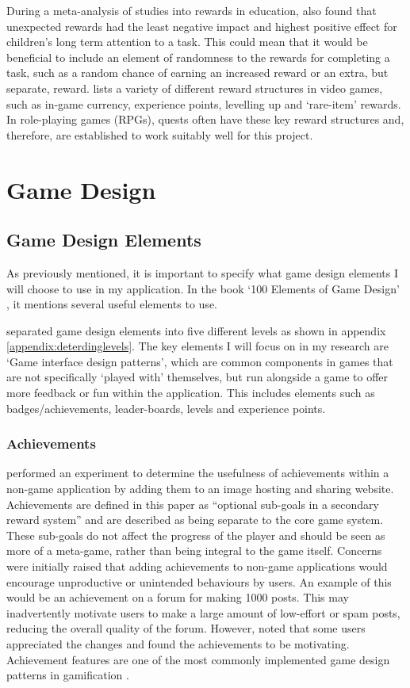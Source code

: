 During a meta-analysis of studies into rewards in education, \cite{deci2001extrinsic} also found that unexpected rewards had the least negative impact and highest positive effect for children's long term attention to a task. 
This could mean that it would be beneficial to include an element of randomness to the rewards for completing a task, such as a random chance of earning an increased reward or an extra, but separate, reward.
\cite{king2010video} lists a variety of different reward structures in video games, such as in-game currency, experience points, levelling up and `rare-item' rewards. 
In role-playing games (RPGs), quests often have these key reward structures and, therefore, are established to work suitably well for this project.

\section{Game Design}
\subsection{Game Design Elements}
As previously mentioned, it is important to specify what game design elements I will choose to use in my application.
In the book `100 Elements of Game Design' \citep{despain2012100}, it mentions several useful elements to use.

\cite{Deterding:2011:GDE:2181037.2181040} separated game design elements into five different levels as shown in appendix \ref{appendix:deterdinglevels}.
The key elements I will focus on in my research are `Game interface design patterns', which are common components in games that are not specifically `played with' themselves, but run alongside a game to offer more feedback or fun within the application.
This includes elements such as badges/achievements, leader-boards, levels and experience points. 

\subsubsection{Achievements}
\cite{Montola:2009:AGA:1621841.1621859} performed an experiment to determine the usefulness of achievements within a non-game application by adding them to an image hosting and sharing website.
Achievements are defined in this paper as ``optional sub-goals in a secondary reward system'' and are described as being separate to the core game system.
These sub-goals do not affect the progress of the player and should be seen as more of a meta-game, rather than being integral to the game itself.
Concerns were initially raised that adding achievements to non-game applications would encourage unproductive or unintended behaviours by users. An example of this would be an achievement on a forum for making 1000 posts. This may inadvertently motivate users to make a large amount of low-effort or spam posts, reducing the overall quality of the forum.
However, \cite{Montola:2009:AGA:1621841.1621859} noted that some users appreciated the changes and found the achievements to be motivating.
Achievement features are one of the most commonly implemented game design patterns in gamification \citep{hamari2011framework}. 

